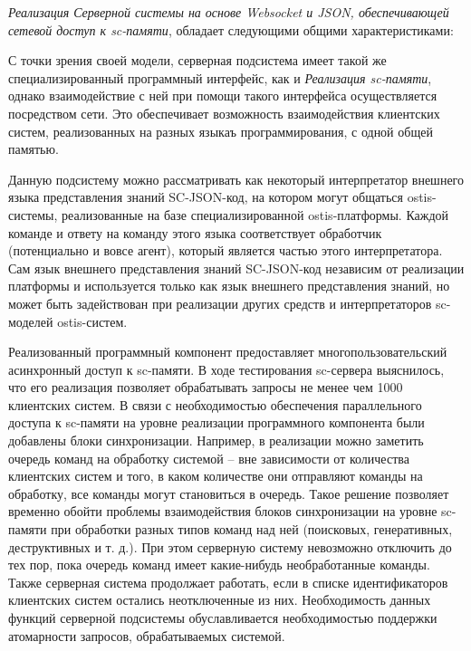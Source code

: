 \textit{Реализация Серверной системы на основе Websocket и JSON, обеспечивающей сетевой доступ к sc-памяти}, обладает следующими общими характеристиками:
\begin{textitemize}
    \item С точки зрения своей модели, серверная подсистема имеет такой же специализированный программный интерфейс, как и \textit{Реализация sc-памяти}, однако взаимодействие с ней при помощи такого интерфейса осуществляется посредством сети. Это обеспечивает возможность взаимодействия клиентских систем, реализованных на разных языкаъ программирования, с одной общей памятью.
    \item Данную подсистему можно рассматривать как некоторый интерпретатор внешнего языка представления знаний SC-JSON-код, на котором могут общаться ostis-системы, реализованные на базе специализированной ostis-платформы. Каждой команде и ответу на команду этого языка соответствует обработчик (потенциально и вовсе агент), который является частью этого интерпретатора. Сам язык внешнего представления знаний SC-JSON-код независим от реализации платформы и используется только как язык внешнего представления знаний, но может быть задействован при реализации других средств и интерпретаторов sc-моделей ostis-систем.
    \item Реализованный программный компонент предоставляет многопользовательский асинхронный доступ к sc-памяти. В ходе тестирования sc-сервера выяснилось, что его реализация позволяет обрабатывать запросы не менее чем 1000 клиентских систем. В связи с необходимостью обеспечения параллельного доступа к sc-памяти на уровне реализации программного компонента были добавлены блоки синхронизации. Например, в реализации можно заметить очередь команд на обработку системой -- вне зависимости от количества клиентских систем и того, в каком количестве они отправляют команды на обработку, все команды могут становиться в очередь. Такое решение позволяет временно обойти проблемы взаимодействия блоков синхронизации на уровне sc-памяти при обработки разных типов команд над ней (поисковых, генеративных, деструктивных и т. д.). При этом серверную систему невозможно отключить до тех пор, пока очередь команд имеет какие-нибудь необработанные команды. Также серверная система продолжает работать, если в списке идентификаторов клиентских систем остались неотключенные из них. Необходимость данных функций серверной подсистемы обуславливается необходимостью поддержки атомарности запросов, обрабатываемых системой.

\end{textitemize}
